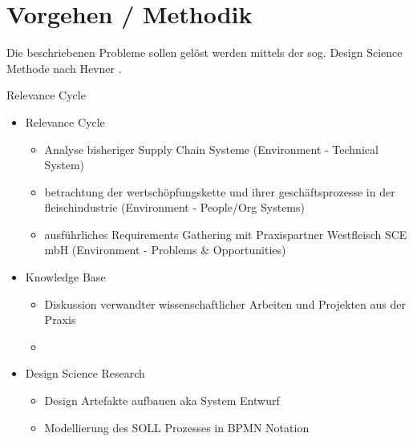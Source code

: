 \section{Vorgehen / Methodik}

Die beschriebenen Probleme sollen gelöst werden mittels der sog. Design Science Methode nach Hevner \citep{Hevner2004, Hevner2007}.

Relevance Cycle \citep{Simon1996}\\

\begin{itemize}
  \item Relevance Cycle
  \begin{itemize}
    \item Analyse bisheriger Supply Chain Systeme (Environment - Technical System)
    \item betrachtung der wertschöpfungskette und ihrer geschäftsprozesse in der fleischindustrie (Environment - People/Org Systems)
    \item ausführliches Requirements Gathering mit Praxispartner Westfleisch SCE mbH (Environment - Problems \& Opportunities)
  \end{itemize}
  \item Knowledge Base
  \begin{itemize}
    \item Diskussion verwandter wissenschaftlicher Arbeiten und Projekten aus der Praxis
    \item
  \end{itemize}
  \item Design Science Research
  \begin{itemize}
    \item Design Artefakte aufbauen aka System Entwurf
    \item Modellierung des SOLL Prozesses in BPMN Notation
  \end{itemize}
\end{itemize}

\newpage
